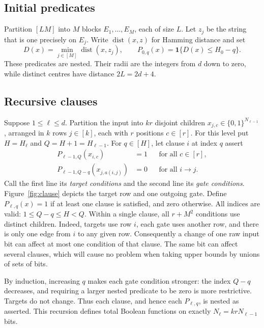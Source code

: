 \subsection{Initial predicates}
Partition \([LM]\) into \(M\) blocks \(E_1,\ldots,E_M\), each of
size \(L\). Let \(z_j\) be the string that is one precisely on \(E_j\).
Write \(\operatorname{dist}(x,z)\) for Hamming distance and set
\[
 D(x)=\min_{j\in[M]}\operatorname{dist}(x,z_j),\qquad
 P_{0,q}(x)=\mathbf1\{D(x)\le H_0-q\}.
\]
These predicates are nested. Their radii are the integers from \(d\)
down to zero, while distinct centres have distance \(2L=2d+4\).

\subsection{Recursive clauses}
Suppose \(1\le\ell\le d\). Partition the input into \(kr\) disjoint
children \(x_{j,c}\in\{0,1\}^{N_{\ell-1}}\), arranged in \(k\) rows
\(j\in[k]\), each with \(r\) positions \(c\in[r]\).
For this level put \(H=H_\ell\) and \(Q=H+1=H_{\ell-1}\).
For \(q\in[H]\), let clause \(i\) at index \(q\) assert
\begin{equation}\label{eq:predicate-definition}
 \begin{aligned}
 P_{\ell-1,Q}(x_{i,c})&=1 &&\text{for all }c\in[r],\\
 P_{\ell-1,Q-q}(x_{j,a(i,j)})&=0 &&\text{for all }i\to j.
 \end{aligned}
\end{equation}
Call the first line its \emph{target conditions} and the second line
its \emph{gate conditions}. Figure~\ref{fig:clause} depicts the target row
and one outgoing gate. Define \(P_{\ell,q}(x)=1\) if at least
one clause is satisfied, and zero otherwise. All indices are valid:
\(1\le Q-q\le H<Q\).
Within a single clause, all \(r+M^2\) conditions use distinct children.
Indeed, targets use row \(i\), each gate uses another row, and there
is only one edge from \(i\) to any given row. Consequently a change
of one raw input bit can affect at most one condition of that clause.
The same bit can affect several clauses, which will cause no problem
when taking upper bounds by unions of sets of bits.

By induction, increasing \(q\) makes each gate condition stronger:
the index \(Q-q\) decreases, and requiring a larger nested predicate
to be zero is more restrictive. Targets do not change. Thus each
clause, and hence each \(P_{\ell,q}\), is nested as asserted.
This recursion defines total Boolean functions on exactly
\(N_\ell=krN_{\ell-1}\) bits.

